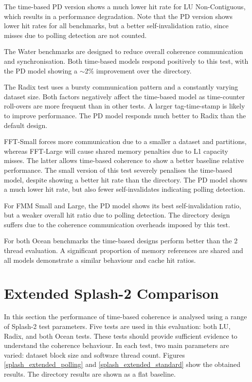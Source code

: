 \clearpage
		The time-based PD version shows a much lower hit rate for LU Non-Contiguous, which results in a performance degradation. Note that the PD version shows lower hit rates for all benchmarks, but a better self-invalidation ratio, since misses due to polling detection are not counted. 
		
		The Water benchmarks are designed to reduce overall coherence communication and synchronisation. Both time-based models respond positively to this test, with the PD model showing a $\sim$2\% improvement over the directory. 
		
		The Radix test uses a bursty communication pattern and a constantly varying dataset size. Both factors negatively affect the time-based model as time-counter roll-overs are more frequent than in other tests. A larger tag-time-stamp is likely to improve performance. The PD model responds much better to Radix than the default design.
		
		FFT-Small forces more communication due to a smaller a dataset and partitions, whereas FFT-Large will cause shared memory penalties due to L1 capacity misses. The latter allows time-based coherence to show a better baseline relative performance. The small version of this test severely penalises the time-based model, despite showing a better hit rate than the directory. The PD model shows a much lower hit rate, but also fewer self-invalidates indicating polling detection.
		
		For FMM Small and Large, the PD model shows its best self-invalidation ratio, but a weaker overall hit ratio due to polling detection. The directory design suffers due to the coherence communication overheads imposed by this test.
		
		For both Ocean benchmarks the time-based designs perform better than the 2 thread evaluation. A significant proportion of memory references are shared and all models demonstrate a similar behaviour and cache hit ratios.
		

	\section{Extended Splash-2 Comparison}
		In this section the performance of time-based coherence is analysed using a range of Splash-2 test parameters. Five tests are used in this evaluation: both LU, Radix, and both Ocean tests. These tests should provide sufficient evidence to understand the coherence behaviour. In each test, two main parameters are varied: dataset block size and software thread count. Figures \ref{splash_extended_polling} and \ref{splash_extended_standard} show the obtained results. The directory results are shown as a flat baseline.
		
